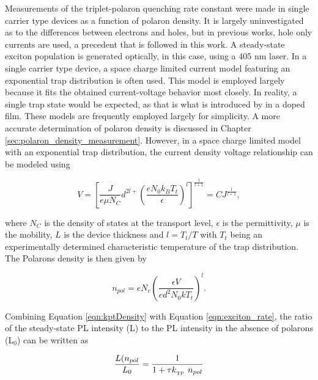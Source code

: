 \documentclass[../thesis.tex]{subfiles}
\begin{document}
Measurements of the triplet-polaron quenching rate constant were made in single carrier type devices as a function of polaron density.  
It is largely uninvestigated as to the differences between electrons and holes, but in previous works, hole only currents are used, a precedent that is followed in this work.\supercite{Erickson2014,Reineke2007}
A steady-state exciton population is generated optically, in this case, using a 405 nm laser.  
In a single carrier type device, a space charge limited current model featuring an exponential trap distribution is often used.\supercite{Lampert2002a,Giebink2009a,Pope1999}
This model is employed largely because it fits the obtained current-voltage behavior most closely.  
In reality, a single trap state would be expected, as that is what is introduced by \irppy in a doped film.  
These models are frequently employed largely for simplicity. 
A more accurate determination of polaron density is discussed in Chapter \ref{sec:polaron_density_measurement}.
However, in a space charge limited model with an exponential trap distribution, the current density voltage relationship can be modeled using\supercite{Pope1999}

\begin{equation}
V=\left[ \frac{J}{e\mu N_C}d^{2l+}\left( \frac{eN_0k_BT_t}{\epsilon} \right)^l \right]^{\frac{1}{l+1}}=CJ^{\frac{1}{l+1}},
\label{eqn:ktpVoltage}
\end{equation}

where $N_C$ is the density of states at the transport level, $\epsilon$ is the permittivity, $\mu$ is the mobility, $L$ is the device thickness and $l=T_t/T$ with $T_t$ being an experimentally determined characteristic temperature of the trap distribution.  The Polarons density is then given by\supercite{Pope1999}

\begin{equation}
n_{pol}=eN_c\left(\frac{\epsilon V}{ed^2N_0kT_t}\right)^l.
\label{eqn:kptDensity}
\end{equation}

Combining Equation \ref{eqn:kptDensity} with Equation \ref{eqn:exciton_rate}, the ratio of the steady-state PL intensity (L) to the PL intensity in the absence of polarons (L$_0$) can be written as\supercite{Reineke2007}

\begin{equation}
\frac{L(n_{pol}}{L_0}=\frac{1}{1+\tau k_{_\text{\tiny TP}}\  n_{pol}}
\label{eqn:ktpFit}
\end{equation}
\end{document}
